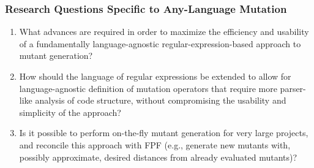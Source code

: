 \subsubsection{Research Questions Specific to Any-Language Mutation}

\begin{enumerate}
\item What advances are required in order to maximize the efficiency and usability of a
  fundamentally language-agnostic regular-expression-based approach to
  mutant generation?
\item How should the language of regular expressions be extended to allow
  for language-agnostic definition of mutation operators that require
  more parser-like analysis of code structure, without compromising
  the usability and simplicity of the approach?
\item Is it possible to perform on-the-fly mutant generation for very
  large projects, and reconcile this approach with FPF (e.g., generate
  new mutants with, possibly approximate, desired distances from
  already evaluated mutants)?
\end{enumerate}


